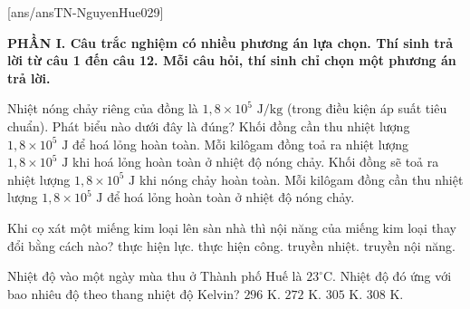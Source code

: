 [ans/ansTN-NguyenHue029]

\noindent \textbf{PHẦN I. Câu trắc nghiệm có nhiều phương án lựa chọn. Thí sinh trả lời từ câu 1 đến câu 12. Mỗi câu hỏi, thí sinh chỉ chọn một phương án trả lời.}
\vspace{0.2cm}

\begin{ex}	Nhiệt nóng chảy riêng của đồng là $1,8 \times 10^{5}\text{ J/kg}$ (trong điều kiện áp suất tiêu chuẩn). Phát biểu nào dưới đây là đúng?
	\choice
	{Khối đồng cần thu nhiệt lượng $1,8 \times 10^{5}\text{ J}$ để hoá lỏng hoàn toàn.}
	{Mỗi kilôgam đồng toả ra nhiệt lượng $1,8 \times 10^{5}\text{ J}$ khi hoá lỏng hoàn toàn ở nhiệt độ nóng chảy.}
	{Khối đồng sẽ toả ra nhiệt lượng $1,8 \times 10^{5}\text{ J}$ khi nóng chảy hoàn toàn.}
	{\True Mỗi kilôgam đồng cần thu nhiệt lượng $1,8 \times 10^{5}\text{ J}$ để hoá lỏng hoàn toàn ở nhiệt độ nóng chảy.}
\end{ex}

\begin{ex}	Khi cọ xát một miếng kim loại lên sàn nhà thì nội năng của miếng kim loại thay đổi bằng cách nào?
	\choice
	{thực hiện lực.}
	{\True thực hiện công.}
	{truyền nhiệt.}
	{truyền nội năng.}
\end{ex}

\begin{ex}	Nhiệt độ vào một ngày mùa thu ở Thành phố Huế là $23^\circ\text{C}$. Nhiệt độ đó ứng với bao nhiêu độ theo thang nhiệt độ Kelvin?
	\choice
	{\True $296\text{ K}$.}
	{$272\text{ K}$.}
	{$305\text{ K}$.}
	{$308\text{ K}$.}
\end{ex}

